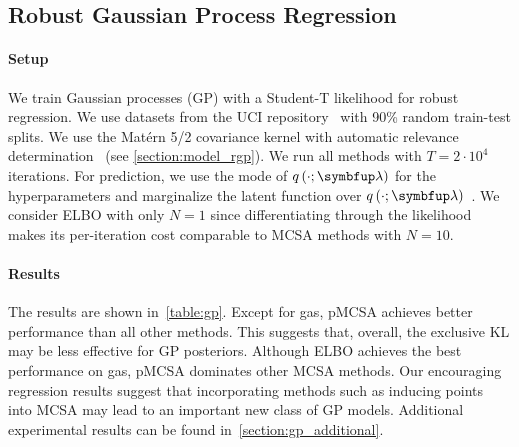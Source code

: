 \subsection{Robust Gaussian Process Regression}\label{section:bgp}
\vspace{-0.07in}
\paragraph{Setup}
We train Gaussian processes (GP) with a Student-T likelihood for robust regression.
We use datasets from the UCI repository~\citep{Dua:2019} with 90\% random train-test splits.
We use the Mat\'ern 5/2 covariance kernel with automatic relevance determination~\citep{neal_bayesian_1996} (see \cref{section:model_rgp}).
We run all methods with \(T=2\cdot10^4\) iterations.
For prediction, we use the mode of \(q\left(\cdot; \vlambda\right)\) for the hyperparameters and marginalize the latent function over \(q\left(\cdot; \vlambda\right)\)~\citep{rasmussen_gaussian_2006}.
We consider ELBO with only \(N=1\) since differentiating through the likelihood makes its per-iteration cost comparable to MCSA methods with \(N=10\).

\vspace{-0.1in}
\paragraph{Results}
The results are shown in~\cref{table:gp}.
Except for \textsf{gas}, pMCSA achieves better performance than all other methods.
This suggests that, overall, the exclusive KL may be less effective for GP posteriors.
Although ELBO achieves the best performance on \textsf{gas}, pMCSA dominates other MCSA methods.
Our encouraging regression results suggest that incorporating methods such as inducing points~\citep{NIPS2005_4491777b} into MCSA may lead to an important new class of GP models.
Additional experimental results can be found in~\cref{section:gp_additional}.

